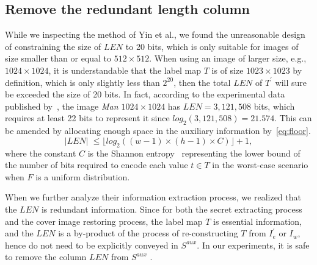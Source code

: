 \subsection{Remove the redundant length column}
\label{sec:improvesize}


While we inspecting the method of Yin et al., we found the unreasonable design of constraining the size of $LEN$ to 20 bits, which is only suitable for images of size smaller than or equal to $512 \times 512$. 
When using an image of larger size, e.g., $1024 \times 1024$, 
it is understandable that the label map $T$ is of size $1023 \times 1023$ by definition, which is only slightly less than $2^{20}$, then the total $LEN$ of $T^\prime$ will sure be exceeded the size of 20 bits. 
In fact, according to the experimental data published by~\cite{Yin2020}, the image \emph{Man $1024 \times 1024$} has $LEN = 3,121,508$ bits, which requires at least 22 bits to represent it since $log_2(3,121,508) = 21.574$.
This can be amended by allocating enough space in the auxiliary information by~\eqref{eq:floor}.
\begin{equation}
	\label{eq:floor}
	\vert LEN \vert \; \leq \lfloor log_2((w - 1) \times (h - 1) \times C ) \rfloor + 1 , 
\end{equation}
where the constant $C$ is the Shannon entropy~\cite{Shannon1948} representing the lower bound of the number of bits required to encode each value $t \in T$ 
in the worst-case scenario when $F$ is a uniform distribution.

When we further analyze 
their information extraction process, 
we realized that the $LEN$ is redundant information. 
Since for both the secret extracting process
and the cover image restoring process,  
the label map $T$ is essential information, 
and the $LEN$ is a by-product of the process of re-constructing $T$ from $I_e^\prime$ or $I_w$, 
hence do not need to be explicitly conveyed in $S^{aux}$. 
In our experiments, it is safe to remove the column $LEN$ from $S^{aux}$ 
.

